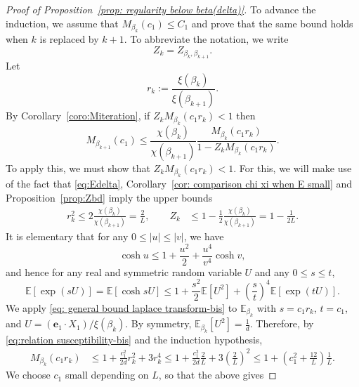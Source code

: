 \documentclass[11pt,a4paper]{article}
\numberwithin{equation}{section}
\theoremstyle{plain}
\theoremstyle{definition}
\newcommand\1{\mathds{1}}
\begin{document}
\begin{proof}[Proof of Proposition~\textup{\ref{prop: regularity below beta(delta)}}]
To advance the induction, we assume that $M_{\beta_k}(c_1) \le C_1$
and prove that the same bound holds when $k$ is replaced by $k+1$.
To abbreviate the notation, we write
\begin{equation}
    Z_k = Z_{\beta_k,\beta_{k+1}}.
\end{equation}
Let
\begin{equation}
    r_k := \frac{\xi(\beta_k)}{\xi(\beta_{k+1})}.
\end{equation}
By Corollary~\ref{coro:Miteration}, if $Z_k M_{\beta_k}(c_1r_k) < 1$ then
\begin{equation}
\label{eq:Msum}
    M_{\beta_{k+1}}(c_1 )
    \le
    \frac{\chi(\beta_k)}{\chi(\beta_{k+1})}
    \frac{M_{\beta_k}(c_1r_k)}{1-Z_k M_{\beta_k}(c_1r_k)}
    .
\end{equation}
To apply this, we must show that $Z_{k} M_{\beta_k}(c_1r_k)<1$.
For this, we will make use of the fact that \eqref{eq:Edelta},
Corollary~\ref{cor: comparison chi xi when E small} and Proposition~\ref{prop:Zbd}
imply the upper bounds
 \begin{align}\label{eq:relation susceptibility-bis}
    r_k^2 \le 2\frac{\chi(\beta_k)}{\chi(\beta_{k+1})}= \frac{2}{L},
\qquad
   Z_{k} &\le  1-\frac{1}{2}\frac{\chi(\beta_k)}{\chi(\beta_{k+1})}=1-\frac{1}{2L}.
    \end{align}
It is elementary that for any $0 \le |u|\le |v|$, we have
\begin{equation}
    \cosh u \le 1 + \frac{u^2}{2} + \frac{u^4}{v^4}\cosh v,
\end{equation}
and hence for any real and symmetric random variable $U$ and
any $0 \le s\le t$,
\begin{equation}\label{eq: general bound laplace transform-bis}
\mathbb E[\exp(sU)] = \mathbb E[\cosh sU]
\le 1+\frac{s^2}{2}\mathbb E[U^2]+\left(\frac st\right)^4\mathbb E[\exp(tU)].
\end{equation}
We apply \eqref{eq: general bound laplace transform-bis}
to $\mathbb E_{\beta_k}$ with $s=c_1r_k$,
$t=c_1$, and $U= (\mathbf{e}_1\cdot X_1)/\xi(\beta_{k})$.
By symmetry, $\mathbb E_{\beta_k}[U^2] =\frac{1}{d}$.
Therefore,  by \eqref{eq:relation susceptibility-bis}
and the induction hypothesis,
\begin{align}
M_{\beta_k}(c_1r_k)
&\le
1+\frac{c_1^2}{2d} r_k^2
+3 r_k^4
\le
1+\frac{c_1^2}{2d}\frac{2}{L}+ 3\left(\frac{2}{L}\right)^{2}
\le 1+\left(c_1^2 + \frac{12}{L}\right)\frac{1}{L} .
\label{eq: proof regularity 2-bis}
\end{align}
We choose $c_1$ small depending on $L$, so that the above gives

\end{proof}
\end{document}

